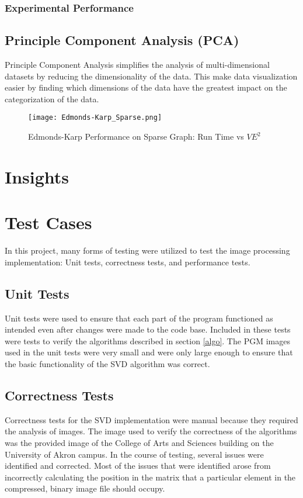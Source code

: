 \documentclass[conference]{IEEEtran}
\begin{document}
\subsubsection{Experimental Performance}



\subsection{Principle Component Analysis (PCA)}
Principle Component Analysis simplifies the analysis of multi-dimensional datasets by 
reducing the dimensionality of the data. This make data visualization easier by finding
which dimensions of the data have the greatest impact on the categorization of the data. 


\begin{figure}
	\centering
	\texttt{[image: Edmonds-Karp\_Sparse.png]}
	\caption{Edmonds-Karp Performance on Sparse Graph: Run Time vs $VE^2$}
	\label{ff_perf_sparse}
\end{figure}


\section{Insights}


\section{Test Cases}
In this project, many forms of testing were utilized to test the image processing implementation: Unit tests, correctness tests,
and performance tests.

\subsection{Unit Tests}
Unit tests were used to ensure that each part of the program functioned as intended even after
changes were made to the code base. Included in these tests were tests to verify the algorithms
described in section \ref{algo}. The PGM images used in the unit tests were very small and were
only large enough to ensure that the basic functionality of the SVD algorithm was correct.  


\subsection{Correctness Tests}
Correctness tests for the SVD implementation were manual because they required the analysis of images.
The image used to verify the correctness of the algorithms was the provided image of the College of 
Arts and Sciences building on the University of Akron campus. In the course of testing, several issues
were identified and corrected. Most of the issues that were identified arose from incorrectly calculating
the position in the matrix that a particular element in the compressed, binary image file should occupy. 
\end{document}

